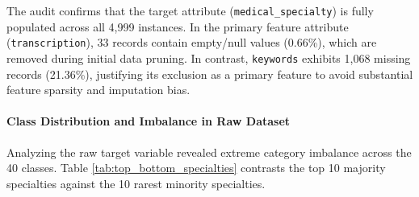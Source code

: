 \begin{table}[H]
\centering
\small
\setlength{\tabcolsep}{4pt}
\noindent{}
\caption{Dataset Attribute Specifications and Missing Value Audit}
\label{tab:column_description}
\end{table}

The audit confirms that the target attribute (\texttt{medical\_specialty}) is fully populated across all 4,999 instances. In the primary feature attribute (\texttt{transcription}), 33 records contain empty/null values (0.66\%), which are removed during initial data pruning. In contrast, \texttt{keywords} exhibits 1,068 missing records (21.36\%), justifying its exclusion as a primary feature to avoid substantial feature sparsity and imputation bias.

\paragraph{Class Distribution and Imbalance in Raw Dataset}
Analyzing the raw target variable revealed extreme category imbalance across the 40 classes. Table \ref{tab:top_bottom_specialties} contrasts the top 10 majority specialties against the 10 rarest minority specialties.

